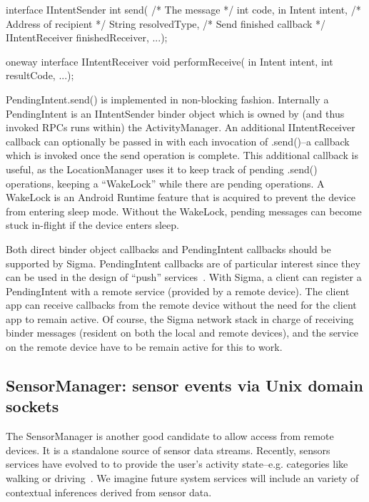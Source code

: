\documentclass[prodmode]{acmlarge}
\begin{document}
\begin{snippet}
interface IIntentSender {
  int send(
    /* The message */
    int code, in Intent intent,
    /* Address of recipient */
    String resolvedType,
    /* Send finished callback */
    IIntentReceiver finishedReceiver,
    ...);
}
\end{snippet}

\begin{snippet}
oneway interface IIntentReceiver {
  void performReceive(
      in Intent intent, int resultCode,
      ...);
}
\end{snippet}

PendingIntent.send() is implemented in non-blocking fashion. Internally a PendingIntent is an IIntentSender binder object which is owned by (and thus invoked RPCs runs within) the ActivityManager. An additional IIntentReceiver callback can optionally be passed in with each invocation of .send()--a callback which is invoked once the send operation is complete. This additional callback is useful, as the LocationManager uses it to keep track of pending .send() operations, keeping a ``WakeLock'' while there are pending operations. A WakeLock is an Android Runtime feature that is acquired to prevent the device from entering sleep mode. Without the WakeLock, pending messages can become stuck in-flight if the device enters sleep.

Both direct binder object callbacks and PendingIntent callbacks should be supported by Sigma. PendingIntent callbacks are of particular interest since they can be used in the design of ``push'' services~\cite{PushTechnology}. With Sigma, a client can register a PendingIntent with a remote service (provided by a remote device). The client app can receive callbacks from the remote device without the need for the client app to remain active. Of course, the Sigma network stack in charge of receiving binder messages (resident on both the local and remote devices), and the service on the remote device have to be remain active for this to work.

\subsection{SensorManager: sensor events via Unix domain sockets}
The SensorManager is another good candidate to allow access from remote devices. It is a standalone source of sensor data streams. Recently, sensors services have evolved to to provide the user's activity state--e.g. categories like walking or driving~\cite{AndroidActivityRecognition}. We imagine future system services will include an variety of contextual inferences derived from sensor data.
\end{document}
